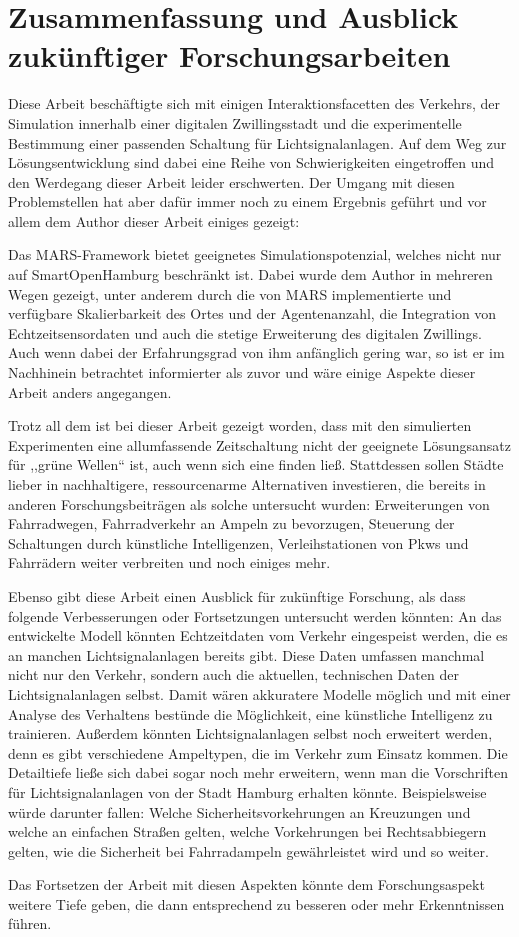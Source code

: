 %


\chapter{Zusammenfassung und Ausblick zukünftiger Forschungsarbeiten}\label{ch:summary}

Diese Arbeit beschäftigte sich mit einigen Interaktionsfacetten des Verkehrs, der Simulation innerhalb einer digitalen Zwillingsstadt und die experimentelle Bestimmung einer passenden Schaltung für Lichtsignalanlagen.
Auf dem Weg zur Lösungsentwicklung sind dabei eine Reihe von Schwierigkeiten eingetroffen und den Werdegang dieser Arbeit leider erschwerten.
Der Umgang mit diesen Problemstellen hat aber dafür immer noch zu einem Ergebnis geführt und vor allem dem Author dieser Arbeit einiges gezeigt:

Das MARS-Framework bietet geeignetes Simulationspotenzial, welches nicht nur auf SmartOpenHamburg beschränkt ist.
Dabei wurde dem Author in mehreren Wegen gezeigt, unter anderem durch die von MARS implementierte und verfügbare Skalierbarkeit des Ortes und der Agentenanzahl, die Integration von Echtzeitsensordaten und auch die stetige Erweiterung des digitalen Zwillings.
Auch wenn dabei der Erfahrungsgrad von ihm anfänglich gering war, so ist er im Nachhinein betrachtet informierter als zuvor und wäre einige Aspekte dieser Arbeit anders angegangen.

Trotz all dem ist bei dieser Arbeit gezeigt worden, dass mit den simulierten Experimenten eine allumfassende Zeitschaltung nicht der geeignete Lösungsansatz für ,,grüne Wellen`` ist, auch wenn sich eine finden ließ.
Stattdessen sollen Städte lieber in nachhaltigere, ressourcenarme Alternativen investieren, die bereits in anderen Forschungsbeiträgen als solche untersucht wurden: Erweiterungen von Fahrradwegen, Fahrradverkehr an Ampeln zu bevorzugen, Steuerung der Schaltungen durch künstliche Intelligenzen, Verleihstationen von Pkws und Fahrrädern weiter verbreiten und noch einiges mehr.

Ebenso gibt diese Arbeit einen Ausblick für zukünftige Forschung, als dass folgende Verbesserungen oder Fortsetzungen untersucht werden könnten:
An das entwickelte Modell könnten Echtzeitdaten vom Verkehr eingespeist werden, die es an manchen Lichtsignalanlagen bereits gibt.
Diese Daten umfassen manchmal nicht nur den Verkehr, sondern auch die aktuellen, technischen Daten der Lichtsignalanlagen selbst.
Damit wären akkuratere Modelle möglich und mit einer Analyse des Verhaltens bestünde die Möglichkeit, eine künstliche Intelligenz zu trainieren.
Außerdem könnten Lichtsignalanlagen selbst noch erweitert werden, denn es gibt verschiedene Ampeltypen, die im Verkehr zum Einsatz kommen.
Die Detailtiefe ließe sich dabei sogar noch mehr erweitern, wenn man die Vorschriften für Lichtsignalanlagen von der Stadt Hamburg erhalten könnte.
Beispielsweise würde darunter fallen: Welche Sicherheitsvorkehrungen an Kreuzungen und welche an einfachen Straßen gelten, welche Vorkehrungen bei Rechtsabbiegern gelten, wie die Sicherheit bei Fahrradampeln gewährleistet wird und so weiter.

Das Fortsetzen der Arbeit mit diesen Aspekten könnte dem Forschungsaspekt weitere Tiefe geben, die dann entsprechend zu besseren oder mehr Erkenntnissen führen.
